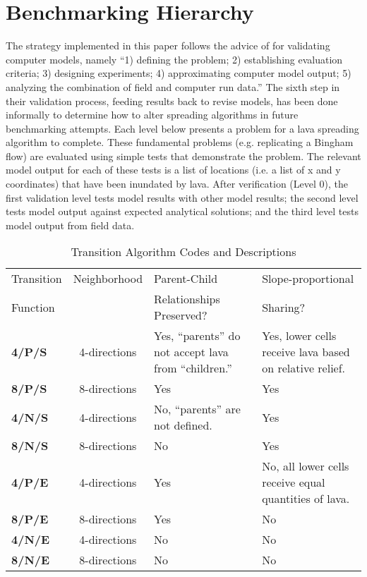 			
			
			

	\section{Benchmarking Hierarchy}\label{sec:benchmark}
	
	The strategy implemented in this paper follows the advice of \citet{bayarri2007framework} for validating computer models, namely ``1) defining the problem; 2) establishing evaluation criteria; 3) designing experiments; 4) approximating computer model output; 5) analyzing the combination of field and computer run data.'' The sixth step in their validation process, feeding results back to revise models, has been done informally to determine how to alter spreading algorithms in future benchmarking attempts. Each level below presents a problem for a lava spreading algorithm to complete. These fundamental problems (e.g. replicating a Bingham flow) are evaluated using simple tests that demonstrate the problem. The relevant model output for each of these tests is a list of locations (i.e. a list of x and y coordinates) that have been inundated by lava. After verification (Level 0), the first validation level tests model results with other model results; the second level tests model output against expected analytical solutions; and the third level tests model output from field data.

	\begin{center}
		\begin{table}[h]
		\caption{Transition Algorithm Codes and Descriptions}
		\begin{tabular}{l c p{5cm} p{5cm}}
			\toprule
			Transition&Neighborhood&Parent-Child&Slope-proportional\\
			Function&&Relationships Preserved?&Sharing?\\
			\midrule
			\textbf{4/P/S} &4-directions & Yes, ``parents'' do not accept lava from ``children.'' & Yes, lower cells receive lava based on relative relief.\\
			\textbf{8/P/S} &8-directions & Yes & Yes\\
			\textbf{4/N/S} &4-directions & No, ``parents'' are not defined. & Yes\\
			\textbf{8/N/S} &8-directions & No  & Yes\\
			\textbf{4/P/E} &4-directions & Yes & No, all lower cells receive equal quantities of lava.\\
			\textbf{8/P/E} &8-directions & Yes & No\\
			\textbf{4/N/E} &4-directions & No  & No\\
			\textbf{8/N/E} &8-directions & No  & No\\
			
			\bottomrule
		\end{tabular}
		\label{tab_algorithmcodes}
		\end{table}
	\end{center}


